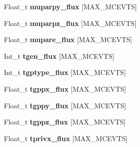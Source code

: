 \begin{DoxyCompactItemize}
\item 
\hypertarget{classanatree_a62ca9aea3bb35e6a7df384f98aa5c7b3}{Float\-\_\-t {\bfseries muparpy\-\_\-flux} \mbox{[}M\-A\-X\-\_\-\-M\-C\-E\-V\-T\-S\mbox{]}}\label{classanatree_a62ca9aea3bb35e6a7df384f98aa5c7b3}

\item 
\hypertarget{classanatree_a5c31b92a9a50d11853cba2dd15e03231}{Float\-\_\-t {\bfseries muparpz\-\_\-flux} \mbox{[}M\-A\-X\-\_\-\-M\-C\-E\-V\-T\-S\mbox{]}}\label{classanatree_a5c31b92a9a50d11853cba2dd15e03231}

\item 
\hypertarget{classanatree_a637dd1d324362e954f3c01266edcbb97}{Float\-\_\-t {\bfseries mupare\-\_\-flux} \mbox{[}M\-A\-X\-\_\-\-M\-C\-E\-V\-T\-S\mbox{]}}\label{classanatree_a637dd1d324362e954f3c01266edcbb97}

\item 
\hypertarget{classanatree_a5a8b604aa6f9b1faae948fc81d3f0302}{Int\-\_\-t {\bfseries tgen\-\_\-flux} \mbox{[}M\-A\-X\-\_\-\-M\-C\-E\-V\-T\-S\mbox{]}}\label{classanatree_a5a8b604aa6f9b1faae948fc81d3f0302}

\item 
\hypertarget{classanatree_af6985f8ca40936b1b3576d7b0769f08a}{Int\-\_\-t {\bfseries tgptype\-\_\-flux} \mbox{[}M\-A\-X\-\_\-\-M\-C\-E\-V\-T\-S\mbox{]}}\label{classanatree_af6985f8ca40936b1b3576d7b0769f08a}

\item 
\hypertarget{classanatree_af2893c67274f6fdc44a2419a78eec747}{Float\-\_\-t {\bfseries tgppx\-\_\-flux} \mbox{[}M\-A\-X\-\_\-\-M\-C\-E\-V\-T\-S\mbox{]}}\label{classanatree_af2893c67274f6fdc44a2419a78eec747}

\item 
\hypertarget{classanatree_a9c4ea5c3d9479ea7d2dba28a4b1b3ec7}{Float\-\_\-t {\bfseries tgppy\-\_\-flux} \mbox{[}M\-A\-X\-\_\-\-M\-C\-E\-V\-T\-S\mbox{]}}\label{classanatree_a9c4ea5c3d9479ea7d2dba28a4b1b3ec7}

\item 
\hypertarget{classanatree_a39bc5e12e8f23aeed43cebd22cc4e4a6}{Float\-\_\-t {\bfseries tgppz\-\_\-flux} \mbox{[}M\-A\-X\-\_\-\-M\-C\-E\-V\-T\-S\mbox{]}}\label{classanatree_a39bc5e12e8f23aeed43cebd22cc4e4a6}

\item 
\hypertarget{classanatree_afc3fc83eea911c2585a49a0f30fbdd19}{Float\-\_\-t {\bfseries tprivx\-\_\-flux} \mbox{[}M\-A\-X\-\_\-\-M\-C\-E\-V\-T\-S\mbox{]}}\label{classanatree_afc3fc83eea911c2585a49a0f30fbdd19}


\end{DoxyCompactItemize}
